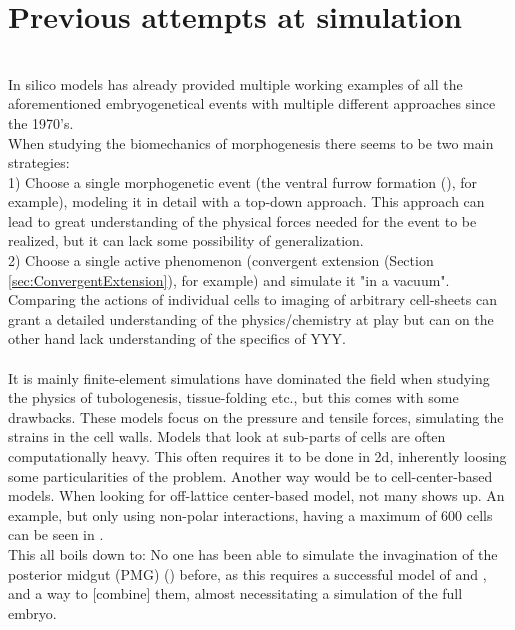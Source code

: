 \section{Previous attempts at simulation}
\\
In silico models has already provided multiple working examples of all the aforementioned embryogenetical events with multiple different approaches since the 1970's.\\
When studying the biomechanics of morphogenesis there seems to be two main strategies:\\
1) Choose a single morphogenetic event (the ventral furrow formation (), for example), modeling it in detail with a top-down approach. This approach can lead to great understanding of the physical forces needed for the event to be realized, but it can lack some possibility of generalization.  \\
2) Choose a single active phenomenon (convergent extension (Section \ref{sec:ConvergentExtension}), for example) and simulate it "in a vacuum". Comparing the actions of individual cells to imaging of arbitrary cell-sheets can grant a detailed understanding of the physics/chemistry at play but can on the other hand lack understanding of the specifics of YYY. \\

\\



It is mainly finite-element simulations have dominated the field when studying the physics of tubologenesis, tissue-folding etc., but this comes with some drawbacks. These  models focus on the pressure and tensile forces, simulating the strains in the cell walls. Models that look at sub-parts of cells are often computationally heavy. This often requires it to be done in 2d\cite{krajnc2018fluidization}, inherently loosing some particularities of the problem. Another way would be to cell-center-based models. When looking for off-lattice center-based model, not many shows up. An example, but only using non-polar interactions, having a maximum of 600 cells can be seen in .\\

This all boils down to: No one has been able to simulate the invagination of the posterior midgut (PMG) () before, as this requires a successful model of  and , and a way to [combine] them, almost necessitating a simulation of the full embryo.


